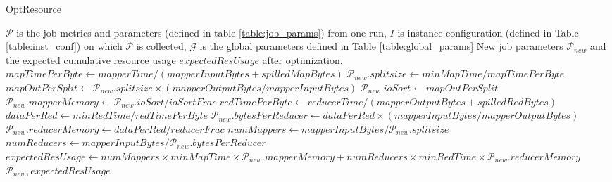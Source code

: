 \renewcommand{\algorithmicrequire}{\textbf{Input:}}
\renewcommand{\algorithmicensure}{\textbf{Output:}}
\renewcommand{\algorithmiccomment}[1]{// #1}
\begin{algorithm}
	\caption{OptResource}\label{alg:optres}
	\begin{algorithmic}[1]
		\footnotesize
		\REQUIRE  $\mathcal{P}$ is the job metrics and parameters (defined in table \ref{table:job_params}) from one run, $I$  is instance configuration (defined in Table \ref{table:inst_conf}) on which $\mathcal{P}$ is collected, $\mathcal{G}$ is the global parameters defined in Table \ref{table:global_params}
		\ENSURE New job parameters $\mathcal{P}_{new}$ and the expected cumulative resource usage $expectedResUsage$ after optimization.
		\STATE $mapTimePerByte \gets mapperTime/(mapperInputBytes + spilledMapBytes)$
		\STATE $\mathcal{P}_{new}.splitsize \gets minMapTime/mapTimePerByte$
		\STATE $mapOutPerSplit \gets \mathcal{P}_{new}.splitsize \times (mapperOutputBytes/mapperInputBytes)$
		\STATE $\mathcal{P}_{new}.ioSort \gets mapOutPerSplit$
		\STATE $\mathcal{P}_{new}.mapperMemory \gets \mathcal{P}_{new}.ioSort / ioSortFrac$
		\STATE $redTimePerByte \gets reducerTime/(mapperOutputBytes + spilledRedBytes)$
		\STATE $dataPerRed \gets minRedTime/redTimePerByte$
		\STATE $\mathcal{P}_{new}.bytesPerReducer \gets dataPerRed \times (mapperInputBytes/mapperOutputBytes)$
		\STATE $\mathcal{P}_{new}.reducerMemory \gets dataPerRed / reducerFrac$
		\STATE $numMappers \gets mapperInputBytes/\mathcal{P}_{new}.splitsize$
		\STATE $numReducers \gets mapperInputBytes/\mathcal{P}_{new}.bytesPerReducer$
		\STATE $expectedResUsage \gets numMappers \times minMapTime \times \mathcal{P}_{new}.mapperMemory  + numReducers \times minRedTime \times \mathcal{P}_{new}.reducerMemory$
		\STATE \RETURN $\mathcal{P}_{new}, expectedResUsage$
	\end{algorithmic}
\end{algorithm}



%

